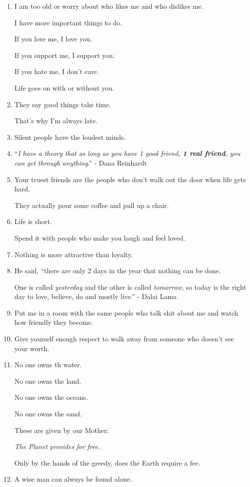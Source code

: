 \documentclass{article}
\numberwithin{equation}{section}
\begin{document}
\begin{enumerate}
    Always keep that in mind.
    \item I am too old or worry about who likes me and who dislikes me.
    
    I have more important things to do.
    
    If you love me, I love you.
    
    If you support me, I support you.
    
    If you hate me, I don't care.
    
    Life goes on with or without you.
    \item They say good things take time.
    
    That's why I'm always late.
    \item Silent people have the loudest minds.
    \item ``\textit{I have a theory that as long as you have 1 good friend, \textbf{1 real friend}, you can get through anything}.'' - Dana Reinhardt
    \item Your truest friends are the people who don't walk out the door when life gets hard.
    
    They actually pour some coffee and pull up a chair.
    \item Life is short.
    
    Spend it with people who make you laugh and feel loved.
    \item Nothing is more attractive than loyalty.
    \item He said, ``there are only 2 days in the year that nothing can be done.
    
    One is called \textit{yesterday} and the other is called \textit{tomorrow}, so today is the right day to love, believe, do and mostly live.'' - Dalai Lama
    \item Put me in a room with the same people who talk shit about me and watch how friendly they become.
    \item Give yourself enough respect to walk away from someone who doesn't see your worth.
    \item No one owns th water.
    
    No one owns the land.
    
    No one owns the oceans.
    
    No one owns the sand.
    
    These are given by our Mother:
    
    \textit{The Planet provides for free}.
    
    Only by the hands of the greedy, does the Earth require a fee.
    \item A wise man can always be found alone.
    

\end{enumerate}
\end{document}
